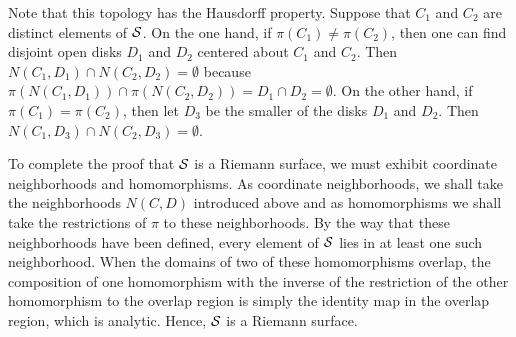 \documentclass[12pt]{article}
\begin{document}
Note that this topology has the Hausdorff property.  Suppose that $C_1$ and $C_2$ are distinct elements of ${\cal S}$.  On the one hand, if $\pi (C_1) \ne \pi (C_2)$, then one can find disjoint open disks $D_1$ and $D_2$ centered about $C_1$ and $C_2$.  Then $N(C_1,D_1) \cap N(C_2,D_2) = \emptyset$ because $\pi (N(C_1,D_1)) \cap \pi(N(C_2,D_2)) = D_1 \cap D_2 = \emptyset$.  On the other hand, if $\pi (C_1) = \pi (C_2)$, then let $D_3$ be the smaller of the disks $D_1$ and $D_2$.  Then $N(C_1,D_3) \cap N(C_2,D_3) = \emptyset$.

To complete the proof that ${\cal S}$ is a Riemann surface, we must exhibit coordinate neighborhoods and homomorphisms.  As coordinate neighborhoods, we shall take the neighborhoods $N(C,D)$ introduced above and as homomorphisms we shall take the restrictions of $\pi$ to these neighborhoods.  By the way that these neighborhoods have been defined, every element of ${\cal S}$ lies in at least one such neighborhood.  When the domains of two of these homomorphisms overlap, the composition of one homomorphism with the inverse of the restriction of the other homomorphism to the overlap region is simply the identity map in the overlap region, which is analytic.  Hence, ${\cal S}$ is a Riemann surface.
\end{document}
